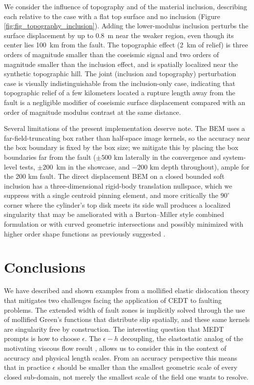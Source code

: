 \documentclass[12pt]{article}
\newcommand{\eps}{\epsilon}
\begin{document}
We consider the influence of topography and of the material inclusion, describing each relative to the case with a flat top surface and no inclusion (Figure \ref{fig:fig_topography_inclusion}).  Adding the lower-modulus inclusion perturbs the surface displacement by up to $0.8$~m near the weaker region, even though its center lies 100~km from the fault.  The topographic effect (2~km of relief) is three orders of magnitude smaller than the coseismic signal and two orders of magnitude smaller than the inclusion effect, and is spatially localized near the synthetic topographic hill.  The joint (inclusion and topography) perturbation case is visually indistinguishable from the inclusion-only case, indicating that topographic relief of a few kilometers located a rupture length away from the fault is a negligible modifier of coseismic surface displacement compared with an order of magnitude modulus contrast at the same distance.

Several limitations of the present implementation deserve note.  The BEM uses a far-field-truncating box rather than half-space image kernels, so the accuracy near the box boundary is fixed by the box size; we mitigate this by placing the box boundaries far from the fault ($\pm 500$ km laterally in the convergence and system-level tests, $\pm 200$~km in the showcase, and $-200$ km depth throughout), ample for the 200 km fault.  The direct displacement BEM on a closed bounded soft inclusion has a three-dimensional rigid-body translation nullspace, which we suppress with a single centroid pinning element, and more critically the $90^\circ$ corner where the cylinder's top disk meets its side wall produces a localized singularity that may be ameliorated with a Burton--Miller style combined formulation \citep{BurtonMiller1971}or with curved geometric intersections and possibly minimized with higher order shape functions as previously suggested \citep{FerrantiCortez2024}.


\section{Conclusions}
We have described and shown examples from a mollified elastic dislocation theory that mitigates two challenges facing the application of CEDT to faulting problems.  The extended width of fault zones is implicitly solved through the use of mollified Green's functions that distribute slip spatially, and these same kernels are singularity free by construction.  The interesting question that MEDT prompts is how to choose $\eps$. The $\epsilon{-}h$ decoupling, the elastostatic analog of the motivating viscous flow result \citep{FerrantiCortez2024}, allows us to consider this in the context of accuracy and physical length scales.  From an accuracy perspective this means that in practice $\eps$ should be smaller than the smallest geometric scale of every closed sub-domain, not merely the smallest scale of the field one wants to resolve.
\end{document}
